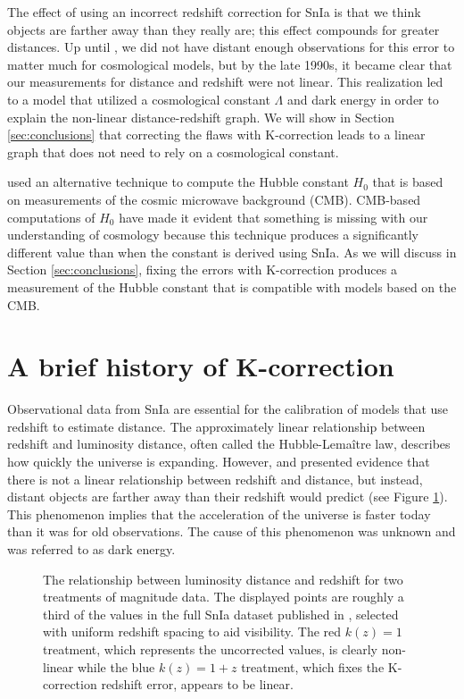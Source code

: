 \documentclass[linenumbers]{aastex631}
\begin{document}
The effect of using an incorrect redshift correction for SnIa is that we think
objects are farther away than they really are; this effect compounds for
greater distances. Up until \citet{riess1998}, we did not have distant enough
observations for this error to matter much for cosmological models, but by the
late 1990s, it became clear that our measurements for distance and redshift
were not linear. This realization led to a model that utilized a cosmological
constant $\Lambda$ and dark energy in order to explain the non-linear
distance-redshift graph. We will show in Section \ref{sec:conclusions} that
correcting the flaws with K-correction leads to a linear graph that does not
need to rely on a cosmological constant.

\citet{planck2015} used an alternative technique to compute the Hubble constant
$H_0$ that is based on measurements of the cosmic microwave background (CMB).
CMB-based computations of $H_0$ have made it evident that something is missing
with our understanding of cosmology because this technique produces a
significantly different value than when the constant is derived using SnIa.  As
we will discuss in Section \ref{sec:conclusions}, fixing the errors with
K-correction produces a measurement of the Hubble constant that is compatible
with models based on the CMB.

\section{A brief history of K-correction}
\label{sec:history}

Observational data from SnIa are essential for the calibration of models that
use redshift to estimate distance. The approximately linear relationship
between redshift and luminosity distance, often called the Hubble-Lema\^{i}tre law,
describes how quickly the universe is expanding. However, \citet{riess1998}
and \citet{perlmutter1999} presented evidence that there is not a linear
relationship between redshift and distance, but instead, distant objects are
farther away than their redshift would predict (see Figure
\ref{fig:mu_distance_vs_redshift}). This phenomenon implies that the
acceleration of the universe is faster today than it was for old observations.
The cause of this phenomenon was unknown and was referred to as dark energy.

\begin{figure}
  \caption{The relationship between luminosity distance and redshift for two
  treatments of magnitude data. The displayed points are roughly a third of the
  values in the full SnIa dataset published in \citet{abbott2024}, selected
  with uniform redshift spacing to aid visibility. The red $k(z) = 1$ treatment,
  which represents the uncorrected values, is clearly non-linear while the blue
  $k(z) = 1 + z$ treatment, which fixes the K-correction redshift error,
  appears to be linear.}
  \label{fig:mu_distance_vs_redshift}
\end{figure}
\end{document}
